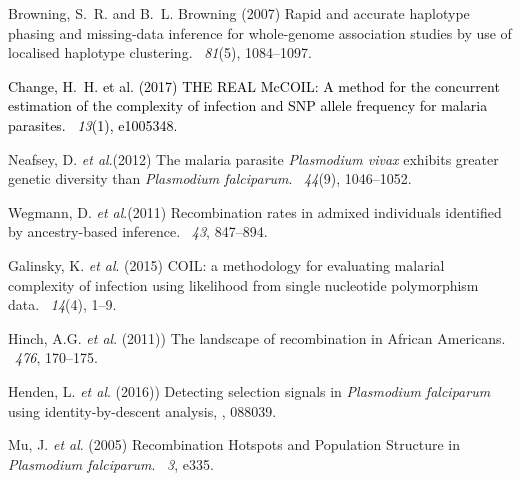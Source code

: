 \documentclass{article}
\begin{document}
\begin{thebibliography}{}

Browning, S.~R. and B.~L. Browning (2007)
\newblock Rapid and accurate haplotype phasing and missing-data inference for
  whole-genome association studies by use of localised haplotype clustering.
~{\em 81\/}(5), 1084--1097.

\textcolor{black}{Change, H.~H. et al. (2017)
\newblock THE REAL McCOIL: A method for the concurrent estimation of the complexity of infection and SNP allele frequency for malaria parasites.
~{\em 13\/}(1), e1005348.}


Neafsey, D. {\em et al}.(2012)
\newblock The malaria parasite {\it Plasmodium vivax} exhibits greater genetic diversity than {\it Plasmodium falciparum}.
~{\em 44\/}(9), 1046--1052.

Wegmann, D. {\em et al}.(2011)
\newblock Recombination rates in admixed individuals identified by ancestry-based inference.
~{\em 43\/}, 847--894.

Galinsky, K. {\em et al}. (2015)
\newblock COIL: a methodology for evaluating malarial complexity of infection using likelihood from single nucleotide polymorphism data.
~{\em14\/}(4), 1--9.

Hinch, A.G. {\em et al}. (2011))
\newblock The landscape of recombination in African Americans.
~{\em 476}, 170--175.

Henden, L. {\em et al}. (2016))
\newblock Detecting selection signals in {\it Plasmodium falciparum} using identity-by-descent analysis,
, 088039.


Mu, J. {\em et al}. (2005)
\newblock Recombination Hotspots and Population Structure in {\it Plasmodium falciparum}.
~{\em 3}, e335.



\end{thebibliography}
\end{document}
